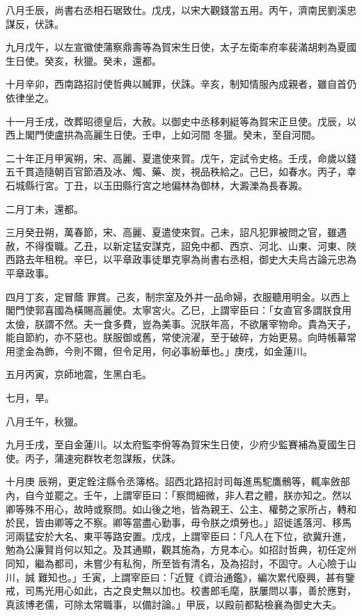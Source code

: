 \begin{pinyinscope}
 八月壬辰，尚書右丞相石琚致仕。戊戌，以宋大觀錢當五用。丙午，濟南民劉溪忠謀反，伏誅。



 九月戊午，以左宣徽使蒲察鼎壽等為賀宋生日使，太子左衛率府率裴滿胡剌為夏國生日使。癸亥，秋獵。癸未，還都。



 十月辛卯，西南路招討使哲典以贓罪，伏誅。辛亥，制知情服內成親者，雖自首仍依律坐之。



 十一月壬戌，改葬昭德皇后，大赦。以御史中丞移剌綎等為賀宋正旦使。戊辰，以西上閣門使盧拱為高麗生日使。壬申，上如河間
 冬獵。癸未，至自河間。



 二十年正月甲寅朔，宋、高麗、夏遣使來賀。戊午，定試令史格。壬戌，命歲以錢五千貫造隨朝百官節酒及冰、燭、藥、炭，視品秩給之。己巳，如春水。丙子，幸石城縣行宮。丁丑，以玉田縣行宮之地偏林為御林，大澱濼為長春澱。



 二月丁未，還都。



 三月癸丑朔，萬春節，宋、高麗、夏遣使來賀。己未，詔凡犯罪被問之官，雖遇赦，不得復職。乙丑，以新定猛安謀克，詔免中都、西京、河北、山東、河東、陜西路去年租稅。辛巳，以平章政事徒單克寧為尚書右丞相，御史大夫烏古論元忠為平章政事。



 四月丁亥，定冒蔭
 罪賞。己亥，制宗室及外并一品命婦，衣服聽用明金。以西上閣門使郭喜國為橫賜高麗使。太寧宮火。乙巳，上謂宰臣曰：「女直官多謂朕食用太儉，朕謂不然。夫一食多費，豈為美事。況朕年高，不欲屠宰物命。貴為天子，能自節約，亦不惡也。朕服御或舊，常使浣濯，至于破碎，方始更易。向時帳幕常用塗金為飾，今則不爾，但令足用，何必事紛華也。」庚戌，如金蓮川。



 五月丙寅，京師地震，生黑白毛。



 七月，旱。



 八月壬午，秋獵。



 九月壬戌，至自金蓮川。以太府監李佾等為賀宋生日使，少府少監賽補為夏國生日使。丙子，蒲速宛群牧老忽謀叛，伏誅。



 十月庚
 辰朔，更定銓注縣令丞簿格。詔西北路招討司每進馬駝鷹鶻等，輒率斂部內，自今並罷之。壬午，上謂宰臣曰：「察問細微，非人君之體，朕亦知之。然以卿等殊不用心，故時或察問。如山後之地，皆為親王、公主、權勢之家所占，轉和於民，皆由卿等之不察。卿等當盡心勤事，毋令朕之煩勞也。」詔徙遙落河、移馬河兩猛安於大名、東平等路安置。戊戌，上謂宰臣曰：「凡人在下位，欲冀升進，勉為公廉賢肖何以知之。及其通顯，觀其施為，方見本心。如招討哲典，初任定州同知，繼為都司，未嘗少有私徇，所至皆有清名，及為招討，不固守。人心險于山川，誠
 難知也。」壬寅，上謂宰臣曰：「近覽《資治通鑑》，編次累代廢興，甚有鑒戒，司馬光用心如此，古之良史無以加也。校書郎毛麾，朕屢問以事，善於應對，真該博老儒，可除太常職事，以備討論。」甲辰，以殿前都點檢襄為御史大夫。




\end{pinyinscope}
